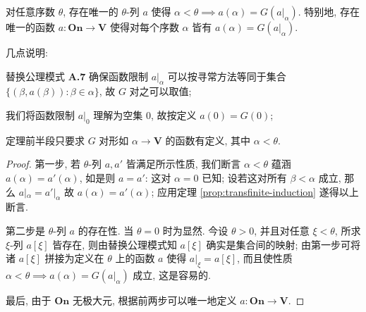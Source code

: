 \begin{theorem}[超穷递归原理]
	对任意序数 $\theta$, 存在唯一的 $\theta$-列 $a$ 使得 $\alpha < \theta \implies a(\alpha) = G(a|_\alpha)$. 特别地, 存在唯一的函数 $a: \textbf{On} \to \textbf{V}$ 使得对每个序数 $\alpha$ 皆有 $a(\alpha) = G(a|_\alpha)$.
\end{theorem}
几点说明:
\begin{inparaenum}[(a)]
	\item 替换公理模式 \textbf{A.7} 确保函数限制 $a|_\alpha$ 可以按寻常方法等同于集合 $\{ (\beta, a(\beta)) : \beta \in \alpha \}$, 故 $G$ 对之可以取值;
	\item 我们将函数限制 $a|_0$ 理解为空集 $0$, 故按定义 $a(0) = G(0)$;
	\item 定理前半段只要求 $G$ 对形如 $\alpha \to \textbf{V}$ 的函数有定义, 其中 $\alpha < \theta$.
\end{inparaenum}
\begin{proof}
	第一步, 若 $\theta$-列 $a, a'$ 皆满足所示性质, 我们断言 $\alpha < \theta$ 蕴涵 $a(\alpha) = a'(\alpha)$, 如是则 $a=a'$: 这对 $\alpha=0$ 已知; 设若这对所有 $\beta < \alpha$ 成立, 那么 $a|_\alpha = a'|_\alpha$ 故 $a(\alpha) = a'(\alpha)$; 应用定理 \ref{prop:transfinite-induction} 遂得以上断言.
	
	第二步是 $\theta$-列 $a$ 的存在性. 当 $\theta=0$ 时为显然. 今设 $\theta > 0$, 并且对任意 $\xi < \theta$, 所求 $\xi$-列 $a[\xi]$ 皆存在, 则由替换公理模式知 $a[\xi]$ 确实是集合间的映射; 由第一步可将诸 $a[\xi]$ 拼接为定义在 $\theta$ 上的函数 $a$ 使得 $a|_\xi = a[\xi]$, 而且使性质 $\alpha < \theta \implies a(\alpha) = G(a|_\alpha)$ 成立, 这是容易的.
	
	最后, 由于 $\textbf{On}$ 无极大元, 根据前两步可以唯一地定义 $a: \textbf{On} \to \textbf{V}$.
\end{proof}

